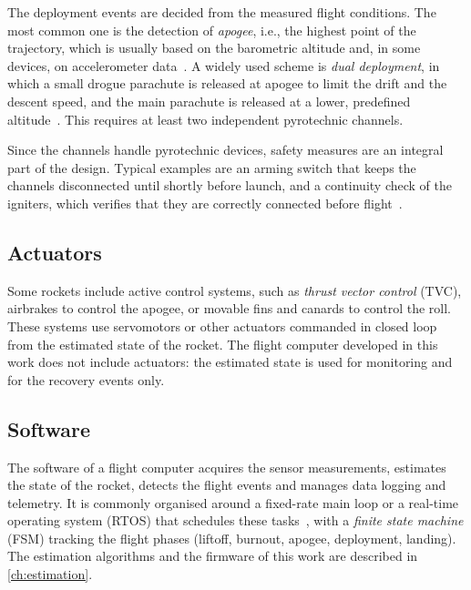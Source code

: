 The deployment events are decided from the measured flight conditions. The most common one is the detection of \emph{apogee}, i.e., the highest point of the trajectory, which is usually based on the barometric altitude and, in some devices, on accelerometer data~\cite{perfectflite,featherweight:blueraven}. A widely used scheme is \emph{dual deployment}, in which a small drogue parachute is released at apogee to limit the drift and the descent speed, and the main parachute is released at a lower, predefined altitude~\cite{altus:telemetrum}. This requires at least two independent pyrotechnic channels.

Since the channels handle pyrotechnic devices, safety measures are an integral part of the design. Typical examples are an arming switch that keeps the channels disconnected until shortly before launch, and a continuity check of the igniters, which verifies that they are correctly connected before flight~\cite{altus:telemetrum}.

\subsection{Actuators} 

Some rockets include active control systems, such as \emph{thrust vector control} (TVC), airbrakes to control the apogee, or movable fins and canards to control the roll. These systems use servomotors or other actuators commanded in closed loop from the estimated state of the rocket. The flight computer developed in this work does not include actuators: the estimated state is used for monitoring and for the recovery events only.

\subsection{Software} 

The software of a flight computer acquires the sensor measurements, estimates the state of the rocket, detects the flight events and manages data logging and telemetry. It is commonly organised around a fixed-rate main loop or a real-time operating system (RTOS) that schedules these tasks~\cite{white2024making}, with a \emph{finite state machine} (FSM) tracking the flight phases (liftoff, burnout, apogee, deployment, landing). The estimation algorithms and the firmware of this work are described in \cref{ch:estimation}.
